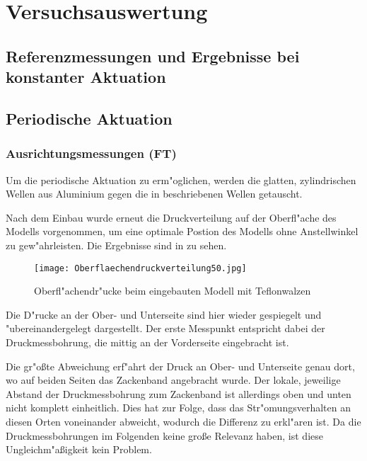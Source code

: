 \chapter{Versuchsauswertung}\label{s:auswertung}

\section{Referenzmessungen und Ergebnisse bei konstanter Aktuation}
\label{sec:ErgebnisseKonstanteAktuation}

\section{Periodische Aktuation}
\subsection{Ausrichtungsmessungen (FT)}
\label{subs:Vorueberlegungen}

Um die periodische Aktuation zu erm"oglichen, werden die glatten, zylindrischen Wellen aus Aluminium gegen die in  beschriebenen Wellen getauscht.

Nach dem Einbau wurde erneut die Druckverteilung auf der Oberfl"ache des Modells vorgenommen, um eine optimale Postion des Modells ohne Anstellwinkel zu gew"ahrleisten. Die Ergebnisse sind in 
zu sehen.

	\begin{figure}[h]
	\centering
	\texttt{[image: Oberflaechendruckverteilung50.jpg]}
	\caption{Oberfl"achendr"ucke beim eingebauten Modell mit Teflonwalzen}
	\label{fig:Oberflaechendruckverteilung 50}
	\end{figure}

Die D"rucke an der Ober- und Unterseite sind hier wieder gespiegelt und "ubereinandergelegt dargestellt. Der erste Messpunkt entspricht dabei der Druckmessbohrung, die mittig an der Vorderseite eingebracht ist.

Die gr"o\ss{}te Abweichung erf"ahrt der Druck an Ober- und Unterseite genau dort, wo auf beiden Seiten das Zackenband angebracht wurde. Der lokale, jeweilige Abstand der Druckmessbohrung zum Zackenband ist allerdings oben und unten nicht komplett einheitlich. Dies hat zur Folge, dass das Str"omungsverhalten an diesen Orten voneinander abweicht, wodurch die Differenz zu erkl"aren ist.
Da die Druckmessbohrungen im Folgenden keine gro\ss{}e Relevanz haben, ist diese Ungleichm"a\ss{}igkeit kein Problem.

